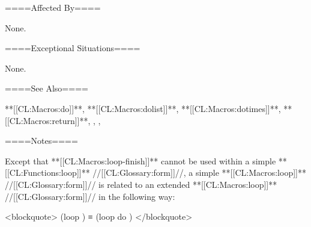 ====Affected By====

None.

====Exceptional Situations====

None.

====See Also====

**[[CL:Macros:do]]**, **[[CL:Macros:dolist]]**, **[[CL:Macros:dotimes]]**, **[[CL:Macros:return]]**, , , {\secref\DestructuringLOOPVars}

====Notes====

Except that **[[CL:Macros:loop-finish]]** cannot be used within a simple **[[CL:Functions:loop]]** //[[CL:Glossary:form]]//, a simple **[[CL:Macros:loop]]** //[[CL:Glossary:form]]// is related to an extended **[[CL:Macros:loop]]** //[[CL:Glossary:form]]// in the following way:

<blockquote> (loop ) ≡ (loop do ) </blockquote>

 
